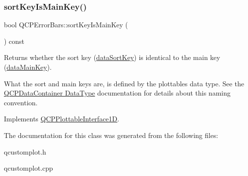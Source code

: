 \subsubsection{\texorpdfstring{sort\+Key\+Is\+Main\+Key()}{sortKeyIsMainKey()}}
{\footnotesize\ttfamily bool Q\+C\+P\+Error\+Bars\+::sort\+Key\+Is\+Main\+Key (\begin{DoxyParamCaption}{ }\end{DoxyParamCaption}) const\hspace{0.3cm}{\ttfamily [virtual]}}

Returns whether the sort key (\hyperlink{class_q_c_p_error_bars_a1ef91328ad7dde84695958139d5f40cf}{data\+Sort\+Key}) is identical to the main key (\hyperlink{class_q_c_p_error_bars_ae3931213f76cd34a824c42c22a1dca74}{data\+Main\+Key}).

What the sort and main keys are, is defined by the plottable\textquotesingle{}s data type. See the \hyperlink{class_q_c_p_data_container_qcpdatacontainer-datatype}{Q\+C\+P\+Data\+Container Data\+Type} documentation for details about this naming convention. 

Implements \hyperlink{class_q_c_p_plottable_interface1_d_a229e65e7ab968dd6cd0e259fa504b79d}{Q\+C\+P\+Plottable\+Interface1D}.



The documentation for this class was generated from the following files\+:\begin{DoxyCompactItemize}
\item 
qcustomplot.\+h\item 
qcustomplot.\+cpp\end{DoxyCompactItemize}
